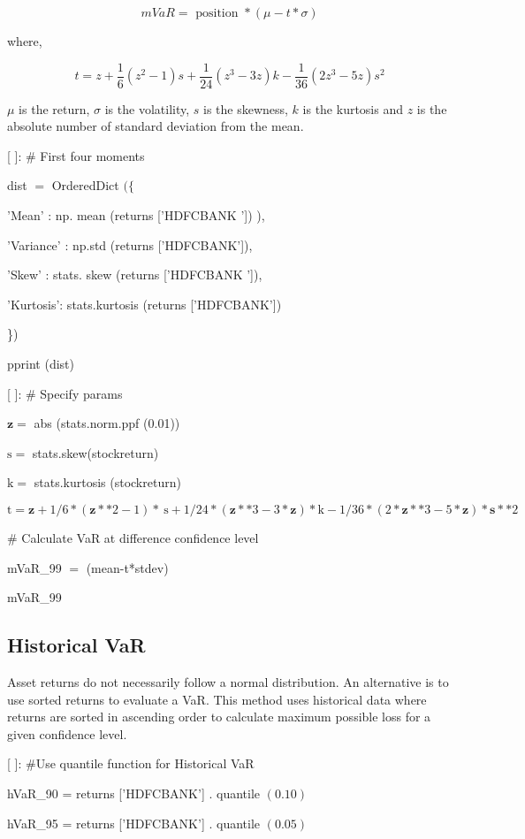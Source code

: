 \documentclass[10pt]{article}
\begin{document}
$$
m V a R=\text { position } *(\mu-t * \sigma)
$$

where,

$$
t=z+\frac{1}{6}\left(z^{2}-1\right) s+\frac{1}{24}\left(z^{3}-3 z\right) k-\frac{1}{36}\left(2 z^{3}-5 z\right) s^{2}
$$

$\mu$ is the return, $\sigma$ is the volatility, $s$ is the skewness, $k$ is the kurtosis and $z$ is the absolute number of standard deviation from the mean.

[ ]: \# First four moments

dist $=$ OrderedDict $(\{$

'Mean' : np. mean (returns ['HDFCBANK ']) ),

'Variance' : np.std (returns ['HDFCBANK']),

'Skew' : stats. skew (returns ['HDFCBANK ']),

'Kurtosis': stats.kurtosis (returns ['HDFCBANK'])

\})

pprint (dist)

[ ]: \# Specify params

$\mathbf{z}=$ abs (stats.norm.ppf (0.01))

$\mathrm{s}=$ stats.skew(stockreturn)

$\mathrm{k}=$ stats.kurtosis (stockreturn)

$\mathrm{t}=\mathbf{z}+1 / 6 *(\mathbf{z} * * 2-1) * \mathrm{~s}+1 / 24 *(\mathbf{z} * * 3-3 * \mathbf{z}) * \mathrm{k}-1 / 36 *(2 * \mathbf{z} * * 3-5 * \mathbf{z}) * \mathbf{s} * * 2$

\# Calculate VaR at difference confidence level

mVaR\_99 $=$ (mean-t*stdev)

mVaR\_99

\subsection*{Historical VaR}
Asset returns do not necessarily follow a normal distribution. An alternative is to use sorted returns to evaluate a VaR. This method uses historical data where returns are sorted in ascending order to calculate maximum possible loss for a given confidence level.

[ ]: \#Use quantile function for Historical VaR

hVaR\_90 = returns ['HDFCBANK'] . quantile $(0.10)$

hVaR\_95 = returns ['HDFCBANK'] . quantile $(0.05)$
\end{document}
